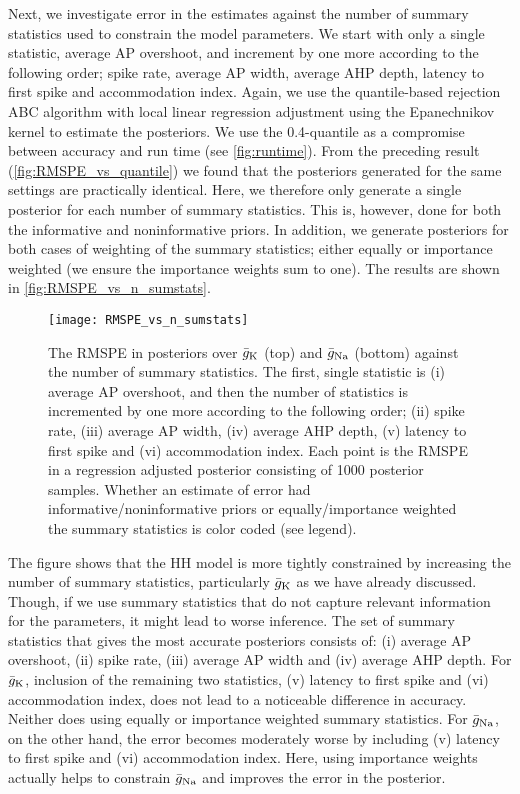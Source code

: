 Next, we investigate error in the estimates against the number of summary statistics used to constrain the model parameters. We start with only a single statistic, average AP overshoot, and increment by one more according to the following order; spike rate, average AP width, average AHP depth, latency to first spike and accommodation index. Again, we use the quantile-based rejection ABC algorithm with local linear regression adjustment using the Epanechnikov kernel to estimate the posteriors. We use the 0.4-quantile as a compromise between accuracy and run time (see \autoref{fig:runtime}). From the preceding result (\autoref{fig:RMSPE_vs_quantile}) we found that the posteriors generated for the same settings are practically identical. Here, we therefore only generate a single posterior for each number of summary statistics. This is, however, done for both the informative and noninformative priors. In addition, we generate posteriors for both cases of weighting of the summary statistics; either equally or importance weighted (we ensure the importance weights sum to one). The results are shown in \autoref{fig:RMSPE_vs_n_sumstats}.
\begin{figure}[!htb]
    \centering
    \texttt{[image: RMSPE\_vs\_n\_sumstats]}
    \caption{The RMSPE in posteriors over $\bar{g}_{\mathrm{K}}$ (top) and $\bar{g}_{\mathrm{Na}}$ (bottom) against the number of summary statistics. The first, single statistic is (i) average AP overshoot, and then the number of statistics is incremented by one more according to the following order; (ii) spike rate, (iii) average AP width, (iv) average AHP depth, (v) latency to first spike and (vi) accommodation index. Each point is the RMSPE in a regression adjusted posterior consisting of 1000 posterior samples. Whether an estimate of error had informative/noninformative priors or equally/importance weighted the summary statistics is color coded (see legend).
    }
    \label{fig:RMSPE_vs_n_sumstats}
\end{figure} 
The figure shows that the HH model is more tightly constrained by increasing the number of summary statistics, particularly $\bar{g}_{\mathrm{K}}$ as we have already discussed. Though, if we use summary statistics that do not capture relevant information for the parameters, it might lead to worse inference. The set of summary statistics that gives the most accurate posteriors consists of: (i) average AP overshoot, (ii) spike rate, (iii) average AP width and (iv) average AHP depth. For $\bar{g}_{\mathrm{K}}$, inclusion of the remaining two statistics, (v) latency to first spike and (vi) accommodation index, does not lead to a noticeable difference in accuracy. Neither does using equally or importance weighted summary statistics. For $\bar{g}_{\mathrm{Na}}$, on the other hand, the error becomes moderately worse by including (v) latency to first spike and (vi) accommodation index. Here, using importance weights actually helps to constrain $\bar{g}_{\mathrm{Na}}$ and improves the error in the posterior. 


